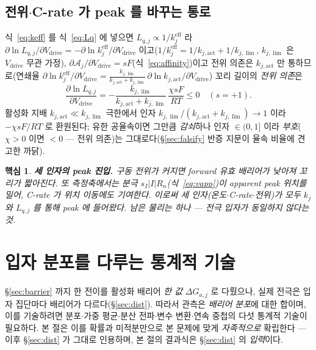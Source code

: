 \documentclass[11pt,a4paper]{article}
\newtheorem*{keybox}{핵심}
\newcommand{\eff}{\mathrm{eff}}
\newcommand{\drive}{\mathrm{drive}}
\begin{document}
\subsection{전위$\cdot$C-rate 가 peak 를 바꾸는 통로}
식~\eqref{eq:keff} 를 식~\eqref{eq:Lq} 에 넣으면 $L_{q,j}\propto1/k_j^{\eff}$ 라 $\partial\ln L_{q,j}/\partial V_\drive=-\partial\ln k_j^{\eff}/\partial V_\drive$ 이고($1/k_j^{\eff}=1/k_{j,\mathrm{act}}+1/k_{j,\lim}$,
$k_{j,\lim}$ 은 $V_\drive$ 무관 가정), $\partial\mathcal A_j/\partial V_\drive=sF$(식~\eqref{eq:affinity})이고 전위 의존은
$k_{j,\mathrm{act}}$ 만 통하므로(연쇄율 $\partial\ln k_j^{\eff}/\partial V_\drive=\tfrac{k_{j,\lim}}{k_{j,\mathrm{act}}+k_{j,\lim}}\,\partial\ln k_{j,\mathrm{act}}/\partial V_\drive$)
꼬리 길이의 \emph{전위 의존}은
\begin{equation}
\frac{\partial\ln L_{q,j}}{\partial V_\drive}=-\frac{k_{j,\lim}}{k_{j,\mathrm{act}}+k_{j,\lim}}\,\frac{\chi sF}{RT}\le0\quad(s=+1).
\label{eq:LqV}
\end{equation}
활성화 지배 $k_{j,\mathrm{act}}\ll k_{j,\lim}$ 극한에서 인자 $k_{j,\lim}/(k_{j,\mathrm{act}}+k_{j,\lim})\to1$ 이라 $-\chi sF/RT$ 로
환원된다; 유한 공율속이면 그만큼 \emph{감쇠}하나 인자 $\in(0,1]$ 이라 \emph{부호}($\chi>0$ 이면 $<0$ — 전위 의존)는
그대로다(\S\ref{sec:falsify} 반증 지문이 율속 비율에 견고한 까닭).
\begin{keybox}
\textbf{세 인자의 peak 진입.} 구동 전위가 커지면 forward 유효 배리어가 낮아져 꼬리가 \emph{짧아진다}. 또 측정축에서는 분극
$s_I|I|R_n$(식~\eqref{eq:vapp})이 apparent peak 위치를 밀어, C-rate 가 \emph{위치} 이동에도 기여한다. \emph{이로써
세 인자(온도$\cdot$C-rate$\cdot$전위)가 모두 $k_j$ 와 $L_{q,j}$ 를 통해 peak 에 들어왔다.} 남은 물리는 하나 —
전극 입자가 \emph{동일하지 않다}는 것.
\end{keybox}

\section{입자 분포를 다루는 통계적 기술}\label{sec:stattools}
\S\ref{sec:barrier} 까지 한 전이를 활성화 배리어 \emph{한 값} $\Delta G_{a,j}$ 로 다뤘으나, 실제 전극은
입자 집단마다 배리어가 다르다(\S\ref{sec:dist}). 따라서 관측은 \emph{배리어 분포}에 대한 합이며, 이를 기술하려면
분포$\cdot$가중 평균$\cdot$분산 전파$\cdot$변수 변환$\cdot$연속 중첩의 다섯 통계적 기술이 필요하다. 본 절은 이를
확률과 미적분만으로 본 문제에 맞게 \emph{자족적으로} 확립한다 — 이후 \S\ref{sec:dist} 가 그대로 인용하며, 본 절의
결과식은 \S\ref{sec:dist} 의 \emph{입력}이다.
\end{document}
